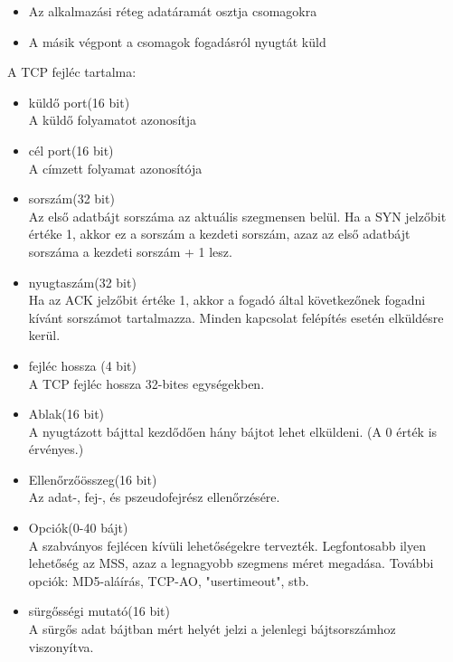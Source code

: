 \documentclass[margin=0px]{article}
\begin{document}
\begin{description}
\begin{itemize}
\begin{itemize}
                      \item Az alkalmazási réteg adatáramát osztja csomagokra
                      \item A másik végpont a csomagok fogadásról nyugtát küld
                  \end{itemize}
                  A TCP fejléc tartalma:
                  \begin{itemize}
                      \item küldő port(16 bit)\\
                            A küldő folyamatot azonosítja
                      \item cél port(16 bit)\\
                            A címzett folyamat azonosítója
                      \item sorszám(32 bit)\\
                            Az első adatbájt sorszáma az aktuális szegmensen belül. Ha a SYN jelzőbit értéke 1, akkor ez a sorszám a kezdeti sorszám, azaz az első adatbájt sorszáma a kezdeti sorszám + 1 lesz.
                      \item nyugtaszám(32 bit)\\
                            Ha az ACK jelzőbit értéke 1, akkor a fogadó által következőnek fogadni 	kívánt sorszámot tartalmazza. Minden kapcsolat felépítés esetén elküldésre kerül.
                      \item fejléc hossza (4 bit)\\
                            A TCP fejléc hossza 32-bites egységekben.
                      \item Ablak(16 bit)\\
                            A nyugtázott bájttal kezdődően hány bájtot lehet elküldeni. (A 0 érték is érvényes.)
                      \item Ellenőrzőösszeg(16 bit)\\
                            Az adat-, fej-, és pszeudofejrész ellenőrzésére.
                      \item Opciók(0-40 bájt)\\
                            A szabványos fejlécen kívüli lehetőségekre tervezték. Legfontosabb ilyen lehetőség az MSS, azaz a legnagyobb szegmens méret megadása. További opciók: MD5-aláírás, TCP-AO, "usertimeout", stb.
                      \item sürgősségi mutató(16 bit) \\
                            A sürgős adat bájtban mért helyét jelzi a jelenlegi bájtsorszámhoz viszonyítva.

\end{itemize}
\end{itemize}
\end{description}
\end{document}
